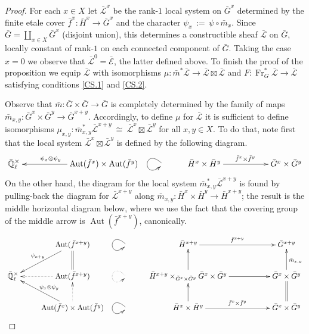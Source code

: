 \documentclass[11pt]{amsart}
\theoremstyle{plain}
\theoremstyle{definition}
\theoremstyle{remark}
\newcommand{\EE}{\mathbb{\bar Q}_\ell}
\newcommand{\Frob}{{\operatorname{Fr}}}
\DeclareMathOperator{\Aut}{Aut}
\newcommand{\ceq}{{\, :=\, }}
\newcommand{\iso}{{\ \cong\ }}
\newcommand{\gcs}[1]{{\mathcal{\bar #1}}}
\begin{document}
\begin{proof}
For each $x\in X$ let $\gcs{L}^x$ be the rank-$1$ local system on ${\bar G}^x$ determined by the finite etale cover ${\bar f}^x : {\bar H}^x \to {\bar G}^x$ and the character $\psi_x \ceq \psi \circ {\bar m}_x$.  Since ${\bar G} = \coprod_{x\in X} {\bar G}^x$ (disjoint union), this determines a constructible sheaf $\gcs{L}$ on ${\bar G}$, locally constant of rank-$1$ on each connected component of ${\bar G}$. Taking the case $x=0$ we observe that $\gcs{L}^0 =\gcs{E}$, the latter defined above. To finish the proof of the proposition we equip $\gcs{L}$ with isomorphisms $\mu : {\bar m}^* \gcs{L} \to \gcs{L} \boxtimes\gcs{L}$ and $F : \Frob_{G}^* \gcs{L} \to \gcs{L}$ satisfying conditions \ref{CS.1} and \ref{CS.2}.

Observe that ${\bar m}: {\bar G}\times {\bar G}\to {\bar G}$ is completely determined by the family of maps ${\bar m}_{x,y} : {\bar G}^x \times {\bar G}^{y} \to {\bar G}^{x+y}$. Accordingly, to define $\mu$ for $\gcs{L}$ it is sufficient to define isomorphisms $\mu_{x,y} : {\bar m}_{x,y}^*\gcs{L}^{x+y} \iso \gcs{L}^{x}\boxtimes \gcs{L}^{y}$ for all $x,y\in X$. To do that, note first that the local system $\gcs{L}^{x}\boxtimes \gcs{L}^{y}$ is defined by the following diagram.
\[
\xymatrix{
\EE^\times && \ar[ll]_{\hskip-20pt \psi_x\otimes \psi_y} \Aut({\bar f}^x)\times \Aut({\bar f}^y)  
& \ar@(ul,dl) & {\bar H}^x\times {\bar H}^y \ar[rr]^{{\bar f}^x\times {\bar f}^y} && {\bar G}^x\times {\bar G}^y\\ 
}
\]
On the other hand, the diagram for the local system ${\bar m}_{x,y}^* \gcs{L}^{x+y}$ is found by pulling-back the diagram for $\gcs{L}^{x+y}$ along ${\bar m}_{x,y} : {\bar H}^x\times{\bar H}^y \to {\bar H}^{x+y}$; the result is the middle horizontal diagram below, where we use the fact that the covering group of the middle arrow is $\Aut({\bar f}^{x+y})$, canonically.
\[
\xymatrix{ 
& \ar[dl]_{\psi_{x+y}} \Aut({\bar f}^{x+y})  
& \ar@(ul,dl) & {\bar H}^{x+y} \ar[rr]^{{\bar f}^{x+y}} && {\bar G}^{x+y}\\ 
\EE^\times & \ar@{.>}[l] \Aut({\bar f}^{x+y})  \ar@{=}[u] &  \ar@{.>}@(ul,dl) & \ar[u] {\bar H}^{x+y} \times_{{\bar G}^x\times{\bar G}^y} {\bar G}^x\times{\bar G}^y \ar[rr] && \ar[u]_{{\bar m}_{x,y}} {\bar G}^x\times {\bar G}^y\\
& \ar[lu]_{\psi_x\otimes \psi_y} \ar@{.>}[u] \Aut({\bar f}^x)\times \Aut({\bar f}^y)  
& \ar@(ul,dl) & \ar[u] {\bar H}^x\times {\bar H}^y \ar[rr]^{{\bar f}^x\times {\bar f}^y} && \ar@{=}[u] {\bar G}^x\times {\bar G}^y\\ 
}
\]

\end{proof}
\end{document}
